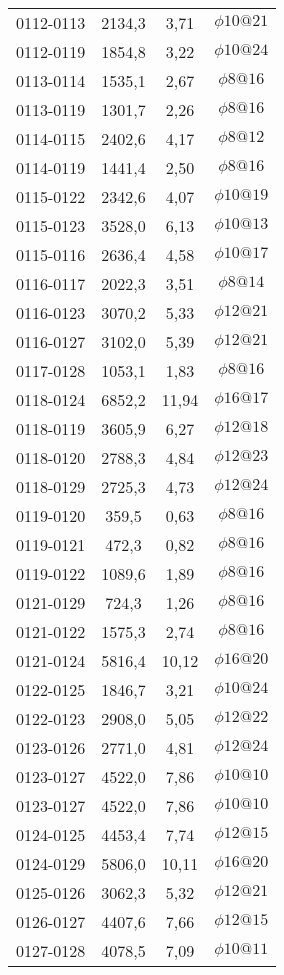 \begin{table}[H]
{\begin{tabular}{cccc}
        0112-0113 & 2134,3 & 3,71  & $\phi10@21$ \\
        0112-0119 & 1854,8 & 3,22  & $\phi10@24$ \\
        0113-0114 & 1535,1 & 2,67  & $\phi8@16$ \\
        0113-0119 & 1301,7 & 2,26  & $\phi8@16$ \\
        0114-0115 & 2402,6 & 4,17  & $\phi8@12$ \\
        0114-0119 & 1441,4 & 2,50  & $\phi8@16$ \\
        0115-0122 & 2342,6 & 4,07  & $\phi10@19$ \\
        0115-0123 & 3528,0 & 6,13  & $\phi10@13$ \\
        0115-0116 & 2636,4 & 4,58  & $\phi10@17$ \\
        0116-0117 & 2022,3 & 3,51  & $\phi8@14$ \\
        0116-0123 & 3070,2 & 5,33  & $\phi12@21$ \\
        0116-0127 & 3102,0 & 5,39  & $\phi12@21$ \\
        0117-0128 & 1053,1 & 1,83  & $\phi8@16$ \\
        0118-0124 & 6852,2 & 11,94 & $\phi16@17$ \\
        0118-0119 & 3605,9 & 6,27  & $\phi12@18$ \\
        0118-0120 & 2788,3 & 4,84  & $\phi12@23$ \\
        0118-0129 & 2725,3 & 4,73  & $\phi12@24$ \\
        0119-0120 & 359,5 & 0,63  & $\phi8@16$ \\
        0119-0121 & 472,3 & 0,82  & $\phi8@16$ \\
        0119-0122 & 1089,6 & 1,89  & $\phi8@16$ \\
        0121-0129 & 724,3 & 1,26  & $\phi8@16$ \\
        0121-0122 & 1575,3 & 2,74  & $\phi8@16$ \\
        0121-0124 & 5816,4 & 10,12 & $\phi16@20$ \\
        0122-0125 & 1846,7 & 3,21  & $\phi10@24$ \\
        0122-0123 & 2908,0 & 5,05  & $\phi12@22$ \\
        0123-0126 & 2771,0 & 4,81  & $\phi12@24$ \\
        0123-0127 & 4522,0 & 7,86  & $\phi10@10$ \\
        0123-0127 & 4522,0 & 7,86  & $\phi10@10$ \\
        0124-0125 & 4453,4 & 7,74  & $\phi12@15$ \\
        0124-0129 & 5806,0 & 10,11 & $\phi16@20$ \\
        0125-0126 & 3062,3 & 5,32  & $\phi12@21$ \\
        0126-0127 & 4407,6 & 7,66  & $\phi12@15$ \\
        0127-0128 & 4078,5 & 7,09  & $\phi10@11$ \bigstrut[b]\\
        \hline
        \end{tabular}%
        }
      \label{resumensuples-1}%
    \end{table}%
    

